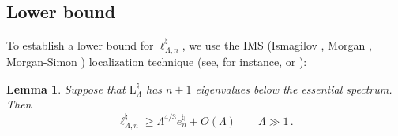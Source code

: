 \documentclass[a4paper,11pt,reqno]{amsart}
\newtheorem{lemma}[theorem]{Lemma}
\theoremstyle{definition}
\numberwithin{equation}{section}
\newcommand{\Lrm}{\mathrm{L}}
\newcommand{\bosfer}{{\natural}}
\begin{document}
\subsection{Lower bound} To establish a lower bound for $\ell_{\Lambda,n}^\bosfer$, we use  the IMS (Ismagilov \cite{ismagilov}, Morgan \cite{morgan}, Morgan-Simon \cite{morgan-simon}) localization technique (see, for instance, \cite[Lemma 3.1]{Sim} or \cite[Chapter 11]{Cycon_etal}):
\begin{lemma}\label{l:lowerbound} Suppose that $\Lrm_\Lambda^\bosfer$ has $n+1$ eigenvalues below the essential spectrum. Then 
    \begin{equation}\label{lower_bound}
        \ell_{\Lambda,n}^\bosfer \geq \Lambda^{4/3} e^{\bosfer}_{n} + O(\Lambda) \qquad \Lambda\gg 1\,.
     \end{equation}
\end{lemma}
\end{document}
